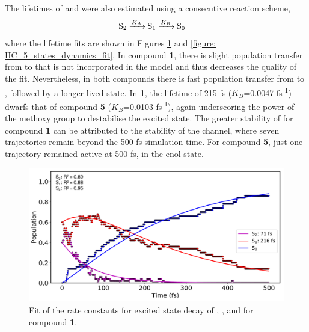 The lifetimes of \stwo{} and \sone{} were also estimated using a consecutive reaction scheme,
\begin{align*}
\centering
\ce{&S_{2} ->[$K_{A}$]S_{1} ->[$K_{B}$] S_{0}}
\end{align*}
where the lifetime fits are shown in Figures \ref{figure: HC_1_states_dynamics_fit} and \ref{figure: HC_5_states_dynamics_fit}. In compound \textbf{1}, there is slight population transfer from \sone{} to \stwo{} that is not incorporated in the model and thus decreases the quality of the \sone{} fit. Nevertheless, in both compounds there is fast population transfer from \stwo{} to \sone{}, followed by a longer-lived \sone{} state. In \textbf{1}, the lifetime of 215 fs ($K_{B}$=0.0047 fs\textsuperscript{-1}) dwarfs that of compound \textbf{5} ($K_{B}$=0.0103 fs\textsuperscript{-1}), again underscoring the power of the methoxy group to destabilise the excited state. The greater stability of \sone{} for compound \textbf{1} can be attributed to the stability of the \Estar{} channel, where seven trajectories remain beyond the 500 fs simulation time. For compound \textbf{5}, just one trajectory remained active at 500 fs, in the enol state.

\begin{figure}[H]
\centering
  \includegraphics[width=0.9\linewidth]{3nonradiativedecay/HC_1_states_dynamics_fit.pdf}
  \caption[Model of the state decay rates for \textbf{HC1}]{Fit of the rate constants for excited state decay of \stwo{}, \sone{}, and \szero{} for compound \textbf{1}.}
  \label{figure: HC_1_states_dynamics_fit}
\end{figure}

